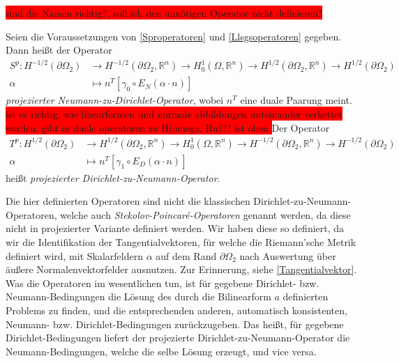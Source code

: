 \colorbox{red}{sind die Namen richtig?, soll ich den unnötigen Operator nicht definieren?}

\begin{defi}\label{Randoperatoren}
Seien die Voraussetzungen von \ref{Sproperatoren} und \ref{Llsgsoperatoren} gegeben. Dann heißt der Operator
\begin{align*}
	S^p: H^{-1/2}(\partial\Omega_2) &\rightarrow H^{-1/2}(\partial\Omega_2, \mathbb{R}^n) \rightarrow H^1_0(\Omega,\mathbb{R}^n) \rightarrow H^{1/2}(\partial\Omega_2, \mathbb{R}^n) \rightarrow H^{1/2}(\partial\Omega_2) \\
	\alpha &\mapsto n^T[\gamma_0 \circ E_N(\alpha \cdot n)]
\end{align*}
\textit{projezierter Neumann-zu-Dirichlet-Operator}, wobei $n^T$ eine duale Paarung meint.
\colorbox{red}{ist es richtig, wie linearformen und normale abbildungen miteinander verkettet werden. gibt es duale operatoren zu H(omega, Rn)?? ist oben  }
Der Operator
\begin{align*}
	T^p: H^{1/2}(\partial\Omega_2) &\rightarrow H^{1/2}(\partial\Omega_2,\mathbb{R}^n) \rightarrow H^1_0(\Omega,\mathbb{R}^n) \rightarrow H^{-1/2}(\partial\Omega_2,\mathbb{R}^n) \rightarrow H^{-1/2}(\partial\Omega_2) \\
	\alpha &\mapsto n^T[\gamma_1 \circ E_D(\alpha \cdot n)]
\end{align*}
heißt \textit{projezierter Dirichlet-zu-Neumann-Operator}.
\end{defi}



Die hier definierten Operatoren sind nicht die klassischen Dirichlet-zu-Neumann-Operatoren, welche auch \textit{Stekolov-Poincaré-Operatoren} genannt werden, da diese nicht in projezierter Variante definiert werden. Wir haben diese so definiert, da wir die Identifikation der Tangentialvektoren, für welche die Riemann'sche Metrik definiert wird, mit Skalarfeldern $\alpha$ auf dem Rand $\partial\Omega_2$ nach Auswertung über äußere Normalenvektorfelder ausnutzen. Zur Erinnerung, siehe \ref{Tangentialvektor}. Was die Operatoren im wesentlichen tun, ist für gegebene Dirichlet- bzw. Neumann-Bedingungen die Lösung des durch die Bilinearform $a$ definierten Problems zu finden, und die entsprechenden anderen, automatisch konsistenten, Neumann- bzw. Dirichlet-Bedingungen zurückzugeben. Das heißt, für gegebene Dirichlet-Bedingungen liefert der projezierte Dirichlet-zu-Neumann-Operator die Neumann-Bedingungen, welche die selbe Lösung erzeugt, und vice versa.

